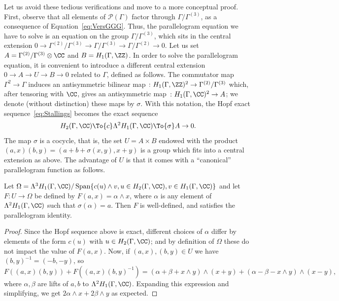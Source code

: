 Let us avoid these tedious verifications and move to a more conceptual proof.
First, observe that all elements of $\mathcal{P}(\Gamma)$ factor through
$\Gamma/\Gamma^{(3)}$, as a consequence of Equation~\eqref{eq:VersGGG}.
Thus, the parallelogram equation we have to solve is an equation on the
group $\Gamma/\Gamma^{(3)}$, which sits in the central extension
$0\to\Gamma^{(2)}/\Gamma^{(3)}\to\Gamma/\Gamma^{(3)}
\to\Gamma/\Gamma^{(2)}\to 0$.
Let us set $A=\Gamma^{(2)}/\Gamma^{(3)}\otimes\CC$ and $B=H_1(\Gamma,\ZZ)$.
In order to solve the parallelogram equation, it is convenient to introduce
a different central extension $0\to A\to U\to B\to 0$ related to $\Gamma$,
defined as follows. The commutator map $\Gamma^2\to \Gamma$ induces an
antisymmetric bilinear map
$\colon H_1(\Gamma,\ZZ)^2\to \Gamma^{(2)}/\Gamma^{(3)}$
which, after tensoring with $\CC$, gives an antisymmetric map
$\colon H_1(\Gamma,\CC)^2\to A$; we denote (without distinction) these maps
by $\sigma$. With this notation, the Hopf exact
sequence~\eqref{eq:Stallings} becomes the exact sequence
\[
H_2(\Gamma,\CC)\To{c}\Lambda^2H_1(\Gamma,\CC) \To{\sigma} A\to 0.
\]
The map $\sigma$ is a cocycle, that is, the set $U=A\times B$ endowed with
the product $(a,x)(b,y)=(a+b+\sigma(x,y),x+y)$ is a group which fits into
a central extension as above. The advantage of $U$ is that it comes with a
``canonical'' parallelogram function as follows.
\begin{lemma}
Let $\Omega=\Lambda^3 H_1(\Gamma,\CC)/\operatorname{Span}\lbrace
c(u)\wedge v, u\in H_2(\Gamma,\CC),v\in H_1(\Gamma,\CC)\rbrace$
and let $F\colon U\to \Omega$ be defined by $F(a,x)=\alpha\wedge x$,
where $\alpha$ is any element of $\Lambda^2H_1(\Gamma,\CC)$ such that
$\sigma(\alpha)=a$.
Then $F$ is well-defined, and satisfies the parallelogram identity.
\end{lemma}

\begin{proof}
Since the Hopf sequence above is exact, different choices of $\alpha$
differ by elements of the form $c(u)$ with $u\in H_2(\Gamma,\CC)$;
and by definition of $\Omega$ these do not impact the value of $F(a,x)$.
Now, if $(a,x),(b,y)\in U$ we have $(b,y)^{-1}=(-b,-y)$, so
\[F((a,x)(b,y))+F((a,x)(b,y)^{-1})=(\alpha+\beta+x\wedge y)\wedge(x+y) +
(\alpha-\beta-x\wedge y)\wedge (x-y), \]
where $\alpha,\beta$ are lifts of $a,b$ to $\Lambda^2H_1(\Gamma,\CC)$.
Expanding this expression and simplifying, we get
$2\alpha\wedge x+2\beta\wedge y$ as expected.
\end{proof}


